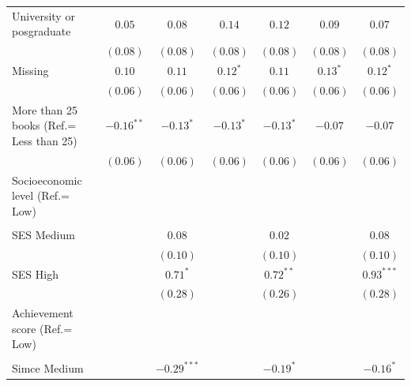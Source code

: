 \documentclass[
  12pt,
  letterpaper,
]{article}
\begin{document}
\begin{table}
{\begin{center}
{\begin{threeparttable}
\begin{tabular}{l c c c c c c}
\quad University or posgraduate           & $0.05$        & $0.08$        & $0.14$        & $0.12$        & $0.09$        & $0.07$        \\
                                          & $(0.08)$      & $(0.08)$      & $(0.08)$      & $(0.08)$      & $(0.08)$      & $(0.08)$      \\
\quad Missing                             & $0.10$        & $0.11$        & $0.12^{*}$    & $0.11$        & $0.13^{*}$    & $0.12^{*}$    \\
                                          & $(0.06)$      & $(0.06)$      & $(0.06)$      & $(0.06)$      & $(0.06)$      & $(0.06)$      \\
More than 25 books (Ref.= Less than 25)   & $-0.16^{**}$  & $-0.13^{*}$   & $-0.13^{*}$   & $-0.13^{*}$   & $-0.07$       & $-0.07$       \\
                                          & $(0.06)$      & $(0.06)$      & $(0.06)$      & $(0.06)$      & $(0.06)$      & $(0.06)$      \\
Socioeconomic level (Ref.= Low)           &               &               &               &               &               &               \\
                                          &               &               &               &               &               &               \\
\quad SES Medium                          &               & $0.08$        &               & $0.02$        &               & $0.08$        \\
                                          &               & $(0.10)$      &               & $(0.10)$      &               & $(0.10)$      \\
\quad SES High                            &               & $0.71^{*}$    &               & $0.72^{**}$   &               & $0.93^{***}$  \\
                                          &               & $(0.28)$      &               & $(0.26)$      &               & $(0.28)$      \\
Achievement score (Ref.= Low)             &               &               &               &               &               &               \\
                                          &               &               &               &               &               &               \\
\quad Simce Medium                        &               & $-0.29^{***}$ &               & $-0.19^{*}$   &               & $-0.16^{*}$   \\

\end{tabular}
\end{threeparttable}}
\end{center}}
\end{table}
\end{document}
